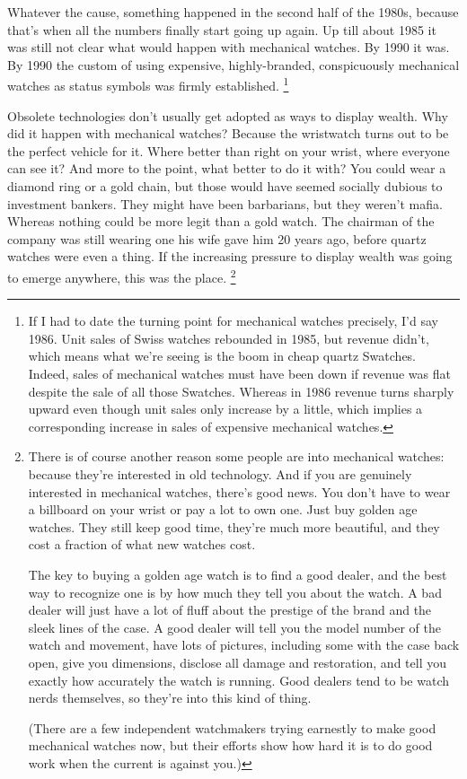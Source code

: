 \documentclass[12pt]{book}
\begin{document}
Whatever the cause, something happened in the second half of the 1980s,
because that's when all the numbers finally start going up again. Up
till about 1985 it was still not clear what would happen with mechanical
watches. By 1990 it was. By 1990 the custom of using expensive,
highly-branded, conspicuously mechanical watches as status symbols was
firmly established. \footnote{If I had to date the turning point for mechanical watches
precisely, I'd say 1986. Unit sales of Swiss watches rebounded in 1985,
but revenue didn't, which means what we're seeing is the boom in cheap
quartz Swatches. Indeed, sales of mechanical watches must have been down
if revenue was flat despite the sale of all those Swatches. Whereas in
1986 revenue turns sharply upward even though unit sales only increase
by a little, which implies a corresponding increase in sales of
expensive mechanical watches.}

Obsolete technologies don't usually get adopted as ways to display
wealth. Why did it happen with mechanical watches? Because the
wristwatch turns out to be the perfect vehicle for it. Where better than
right on your wrist, where everyone can see it? And more to the point,
what better to do it with? You could wear a diamond ring or a gold
chain, but those would have seemed socially dubious to investment
bankers. They might have been barbarians, but they weren't mafia.
Whereas nothing could be more legit than a gold watch. The chairman of
the company was still wearing one his wife gave him 20 years ago, before
quartz watches were even a thing. If the increasing pressure to display
wealth was going to emerge anywhere, this was the place.
\footnote{There is of course another reason some people are into
mechanical watches: because they're interested in old technology. And if
you are genuinely interested in mechanical watches, there's good news.
You don't have to wear a billboard on your wrist or pay a lot to own
one. Just buy golden age watches. They still keep good time, they're
much more beautiful, and they cost a fraction of what new watches cost.

The key to buying a golden age watch is to find a good dealer, and the
best way to recognize one is by how much they tell you about the watch.
A bad dealer will just have a lot of fluff about the prestige of the
brand and the sleek lines of the case. A good dealer will tell you the
model number of the watch and movement, have lots of pictures, including
some with the case back open, give you dimensions, disclose all damage
and restoration, and tell you exactly how accurately the watch is
running. Good dealers tend to be watch nerds themselves, so they're into
this kind of thing.

(There are a few independent watchmakers trying earnestly to make good
mechanical watches now, but their efforts show how hard it is to do good
work when the current is against you.)}
\end{document}
